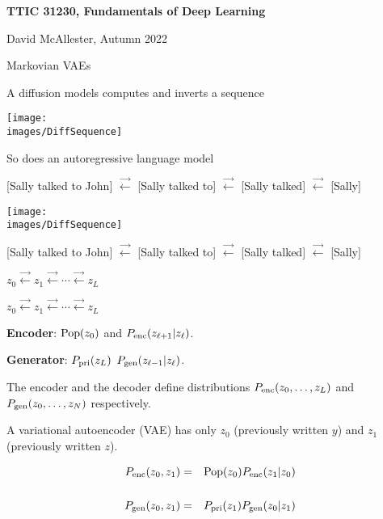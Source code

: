 





{\Huge

  \centerline{\bf TTIC 31230, Fundamentals of Deep Learning}
  \bigskip
  \centerline{David McAllester, Autumn 2022}
  \vfill
  \vfil
  \centerline{Markovian VAEs}
  \vfill
  \vfill


A diffusion models computes and inverts a sequence

\vfill
\centerline{\texttt{[image: \\images/DiffSequence]}}

\vfill
So does an autoregressive language model

\vfill
{\huge
\centerline{{\color{red} [Sally talked to John]} $\stackrel{\rightarrow}{\leftarrow}$ {\color{red} [Sally talked to]}
$\stackrel{\rightarrow}{\leftarrow}$ {\color{red}[Sally talked]} $\stackrel{\rightarrow}{\leftarrow}$ {\color{red}[Sally]}}
}




\centerline{\texttt{[image: \\images/DiffSequence]}}

\vfill
{\huge
\centerline{{\color{red} [Sally talked to John]} $\stackrel{\rightarrow}{\leftarrow}$ {\color{red} [Sally talked to]}
$\stackrel{\rightarrow}{\leftarrow}$ {\color{red}[Sally talked]} $\stackrel{\rightarrow}{\leftarrow}$ {\color{red}[Sally]}}
}

\vfill
\centerline{$z_0 \stackrel{\rightarrow}{\leftarrow} z_1  \stackrel{\rightarrow}{\leftarrow} \cdots \stackrel{\rightarrow}{\leftarrow} z_L$}

\centerline{$z_0 \stackrel{\rightarrow}{\leftarrow} z_1  \stackrel{\rightarrow}{\leftarrow} \cdots \stackrel{\rightarrow}{\leftarrow} z_L$}

\vfill
{\bf Encoder}: $\mathrm{Pop}(z_0)$ and $P_{\mathrm{enc}}(z_{\ell+1}|z_\ell)$.


\vfill
{\bf Generator}: $P_{\mathrm{pri}}(z_L)$ $P_{\mathrm{gen}}(z_{\ell-1}|z_\ell)$.

\vfill
The encoder and the decoder define distributions $P_{\mathrm{enc}}(z_0,\ldots,z_L)$ and $P_{\mathrm{gen}}(z_0,\ldots,z_N)$ respectively.


A variational autoencoder (VAE) has only $z_0$ (previously written $y$) and $z_1$ (previously written $z$).

\begin{eqnarray*}
P_{\mathrm{enc}}(z_0,z_1) & = & \mathrm{Pop}(z_0)P_{\mathrm{enc}}(z_1|z_0) \\
\\
P_{\mathrm{gen}}(z_0,z_1) & = & P_{\mathrm{pri}}(z_1)P_{\mathrm{gen}}(z_0|z_1)
\end{eqnarray*}


}

